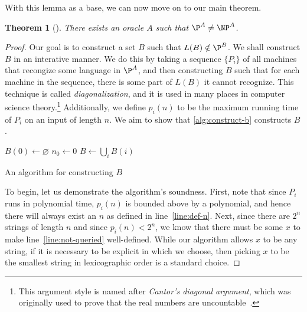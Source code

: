 \documentclass[english]{reedthesis}
\theoremstyle{plain}
\newtheorem{thm}{Theorem}[section]
\theoremstyle{definition}
\theoremstyle{remark}
\begin{document}
With this lemma as a base, we can now move on to our main theorem.

\begin{thm}[{\cite[Theorem 3]{BGS75}}]\label{thm:p-np-nrel}
  There exists an oracle $A$ such that $\P^{A} \ne \NP^{A}$.
\end{thm}

\begin{proof}
  Our goal is to construct a set $B$ such that $L(B) \notin \P^{B}$. We shall
  construct $B$ in an interative manner. We do this by taking a sequence
  $\{P_{i}\}$ of all machines that recongize some language in $\P^{A}$, and then
  constructing $B$ such that for each machine in the sequence, there is some
  part of $L(B)$ it cannot recognize. This technique is called
  \emph{diagonalization}, and it is used in many places in computer science
  theory.\footnote{This argument style is named after \emph{Cantor's diagonal
      argument}, which was originally used to prove that the real numbers are
    uncountable~\cite[Thm. 2.14]{Ru76}.} Additionally, we define $p_{i}(n)$ to
  be the maximum running time of $P_{i}$ on an input of length $n$. We aim to
  show that \cref{alg:construct-b} constructs $B$.

  \begin{algorithm}[htbp]
    $B(0) \leftarrow \varnothing$\;
    $n_{0} \leftarrow 0$\;
    $B \leftarrow \bigcup_{i}B(i)$\;
    \caption{An algorithm for constructing $B$}\label{alg:construct-b}
  \end{algorithm}

  To begin, let us demonstrate the algorithm's soundness. First, note that since
  $P_{i}$ runs in polynomial time, $p_{i}(n)$ is bounded above by a polynomial,
  and hence there will always exist an $n$ as defined in line~\ref{line:def-n}.
  Next, since there are $2^{n}$ strings of length $n$ and since
  $p_{i}(n) < 2^{n}$, we know that there must be some $x$ to make
  line~\ref{line:not-queried} well-defined. While our algorithm allows $x$ to be
  any string, if it is necessary to be explicit in which we choose, then picking
  $x$ to be the smallest string in lexicographic order is a standard choice.


\end{proof}
\end{document}
